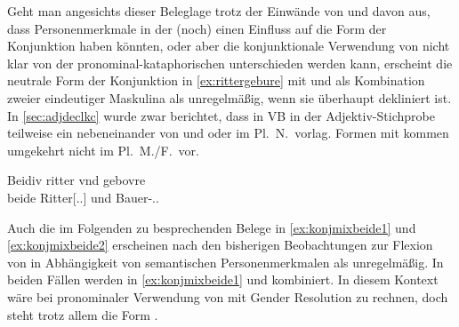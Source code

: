 Geht man angesichts dieser Beleglage trotz der Einwände von
\citet{gjelsten1980} und \citet{ksw2} davon aus, dass Personenmerkmale in der
\KC{} (noch) einen Einfluss auf die Form der Konjunktion haben
könnten, oder aber die konjunktionale Verwendung von  nicht
klar von der pronominal-kataphorischen unterschieden werden kann, erscheint
die neutrale Form der Konjunktion in \cref{ex:rittergebure} mit 
 und   als Kombination zweier
eindeutiger Maskulina als unregelmäßig, wenn sie überhaupt dekliniert ist. In
\cref{sec:adjdeclkc} wurde zwar berichtet, dass in VB in der
Adjektiv-Stichprobe teilweise ein nebeneinander von  und 
oder  im Pl.~N.\ vorlag. Formen mit  kommen umgekehrt
nicht im Pl.~M./F.\ vor.

\begin{exe}
\ex\label{ex:rittergebure}
	\gll Beidiv ritter vnd gebovre \\
		beide Ritter[\Acc.\Pl.\MascM] und Bauer-\Acc.\Pl.\MascM{} \\
	\begin{taggedline}{\parencite[\pno~109va,29]{kc:VB}}
	\trans {}
	\end{taggedline}
\end{exe}

Auch die im Folgenden zu besprechenden Belege in \cref{ex:konjmixbeide1} und
\cref{ex:konjmixbeide2} erscheinen nach den bisherigen Beobachtungen zur
Flexion von  in Abhängigkeit von semantischen Personenmerkmalen
als unregelmäßig. In beiden Fällen werden in \cref{ex:konjmixbeide1}
 und  kombiniert. In diesem Kontext wäre bei pronominaler
Verwendung von  mit Gender Resolution zu rechnen, doch steht
trotz allem die Form .

